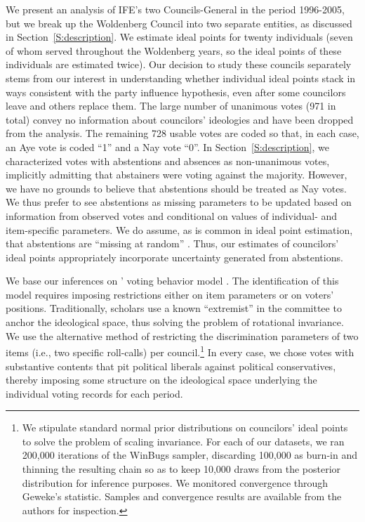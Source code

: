 \documentclass[12 pt, letter]{article}
\begin{document}
We present an analysis of IFE's two Councils-General in the period
1996-2005, but we break up the Woldenberg Council into two separate
entities, as discussed in Section~\ref{S:description}.  We estimate
ideal points for twenty individuals (seven of whom served throughout
the Woldenberg years, so the ideal points of these individuals are
estimated twice).  Our decision to study these councils separately
stems from our interest in understanding whether individual ideal
points stack in ways consistent with the party influence hypothesis,
even after some councilors leave and others replace them. The large
number of unanimous votes (971 in total) convey no information about
councilors' ideologies and have been dropped from the analysis.  The
remaining 728 usable votes are coded so that, in each case, an Aye
vote is coded ``1'' and a Nay vote ``0''.  In
Section~\ref{S:description}, we characterized votes with abstentions
and absences as non-unanimous votes, implicitly admitting that
abstainers were voting against the majority.  However, we have no
grounds to believe that abstentions should be treated as Nay votes.
We thus prefer to see abstentions as missing parameters to be
updated based on information from observed votes and conditional on
values of individual- and item-specific parameters.  We do assume,
as is common in ideal point estimation, that abstentions are
``missing at random'' \citep{Little1987, Clinton2004}.  Thus, our
estimates of councilors' ideal points appropriately incorporate
uncertainty generated from abstentions.


We base our inferences on \citeauthor*{Clinton2004}' voting behavior
model \citep{Clinton2004, Martin2002}.  The identification of this
model requires imposing restrictions either on item parameters or on
voters' positions.  Traditionally, scholars use a known
``extremist'' in the committee to anchor the ideological space, thus
solving the problem of rotational invariance.  We use the
alternative method of restricting the discrimination parameters of
two items (i.e., two specific roll-calls) per council.\footnote{We
stipulate standard normal prior distributions on councilors' ideal
points to solve the problem of scaling invariance. For each of our
datasets, we ran 200,000 iterations of the WinBugs sampler,
discarding 100,000 as burn-in and thinning the resulting chain so as
to keep 10,000 draws from the posterior distribution for inference
purposes. We monitored convergence through Geweke's statistic.
Samples and convergence results are available from the authors for
inspection.} In every case, we chose votes with substantive contents
that pit political liberals against political conservatives, thereby
imposing some structure on the ideological space underlying the
individual voting records for each period.
\end{document}
